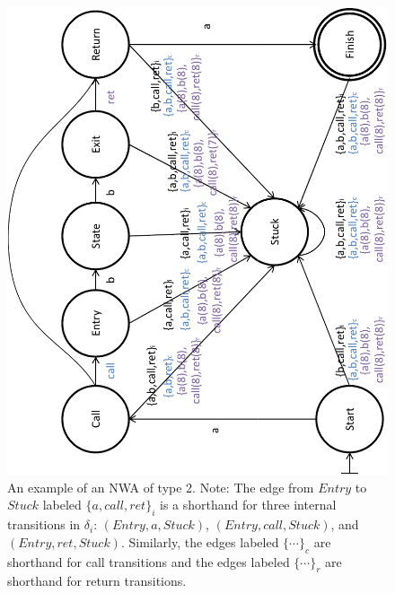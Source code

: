 \begin{figure}[htb]
  \centering
    \includegraphics[width=12cm]{Figures/Figure2}
  \caption{An example of an NWA of type 2.  Note: The edge from $Entry$ to
    $Stuck$ labeled $\{a,call,ret\}_i$ is a shorthand for three internal
    transitions in $\delta_i$: $(Entry,a,Stuck)$, $(Entry,call,Stuck)$, and
    $(Entry,ret,Stuck)$.  Similarly, the edges labeled $\{\cdots\}_c$ are
    shorthand for call transitions and the edges labeled $\{\cdots\}_r$ are
    shorthand for return transitions.}
  \label{Fig:Example2}
\end{figure}


